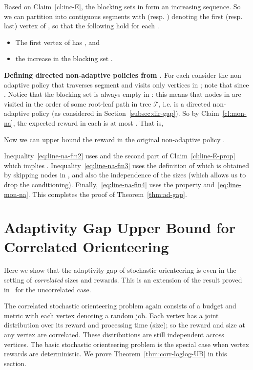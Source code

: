 \documentclass[11pt,letterpaper]{article}
\numberwithin{algorithm}{section}
\newcommand{\T}{\ensuremath{\mathcal{T}}\xspace}
\begin{document}
Based on Claim~\ref{cl:inc-E}, the blocking sets in  form an increasing sequence. So we can partition  into contiguous segments  with  (resp. ) denoting the first (resp. last) vertex of ,  so that the following hold for each .
\begin{itemize}
\item The first vertex  of  has , and
\item the increase in the blocking set .
\end{itemize}

{\bf Defining directed non-adaptive policies from .} For each  consider the non-adaptive policy  that traverses segment  and visits only vertices in ; note that  since . Notice that the blocking set is always empty in : this means that nodes in  are visited in the order of some root-leaf path in tree \T, i.e.  is a directed non-adaptive policy (as considered in Section~\ref{subsec:dir-gap}). So by Claim~\ref{cl:mon-na}, the expected reward in each  is at most . That is,


Now we can upper bound the reward in the original non-adaptive policy .

Inequality~\eqref{eq:line-na-fin2} uses  and the second part of Claim~\ref{cl:line-E-prop} which implies . Inequality~\eqref{eq:line-na-fin3} uses the definition of  which is obtained by skipping nodes  in , and also the independence of the sizes (which allows us to drop the conditioning). Finally,~\eqref{eq:line-na-fin4} uses the property  and~\eqref{eq:line-mon-na}. This completes the proof of Theorem~\ref{thm:ad-gap}.



\section{Adaptivity Gap Upper Bound for Correlated  Orienteering} \label{sec:corr-ad-gap}
Here we show that the adaptivity gap of stochastic orienteering is  even in the setting of {\em correlated} sizes and rewards. This is an extension of the result proved in~\cite{GKNR12} for the uncorrelated case.

The correlated stochastic orienteering problem again consists of a budget  and metric  with each vertex  denoting a random job. Each vertex has a joint distribution over its reward and processing time (size); so the reward and size at any vertex are correlated. These distributions are still independent across vertices. The basic stochastic orienteering problem is the special case when vertex rewards are deterministic. We prove Theorem~\ref{thm:corr-loglog-UB} in this section.
\end{document}
